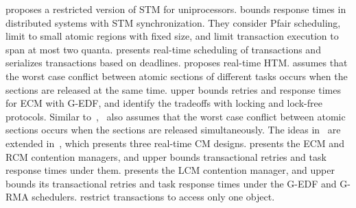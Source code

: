 \documentclass[10pt, conference, compsocconf]{IEEEtran}
\begin{document}
\cite{manson2006preemptible} proposes a restricted version of STM for uniprocessors. %
\cite{fahmy2009bounding} bounds response times in distributed  systems with STM synchronization. They consider Pfair scheduling, limit to small atomic regions with fixed size, and limit transaction execution to span at most two quanta. 
\cite{sarni2009real} presents real-time scheduling of transactions and serializes transactions based on deadlines. 
\cite{schoeberl2010rttm} proposes real-time HTM. \cite{schoeberl2010rttm} assumes that the worst case conflict between atomic sections of different tasks occurs when the sections are released at the same time. 
\cite{key-1} upper bounds retries and response times for ECM with G-EDF, and identify the tradeoffs with locking and lock-free protocols. Similar to~\cite{schoeberl2010rttm},~\cite{key-1} also assumes that the worst case conflict between atomic sections occurs when the sections are released simultaneously. The ideas in~\cite{key-1} are extended in~\cite{barrosmanaging}, which presents three real-time CM designs. 
\cite{stmconcurrencycontrol:emsoft11} presents the ECM and RCM contention managers, and upper bounds transactional retries and task response times under them. 
%
\cite{lcmdac2012} presents the LCM contention manager, and upper bounds its transactional retries and task response times under the G-EDF and G-RMA schedulers. 
\cite{lcmdac2012,stmconcurrencycontrol:emsoft11} restrict transactions to access only one object. 
\end{document}
